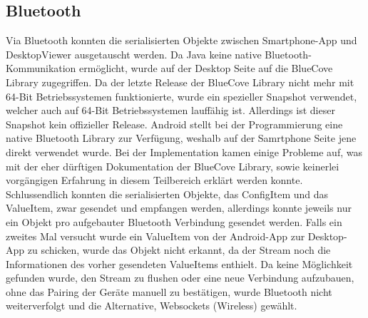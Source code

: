 \subsection{Bluetooth}
Via Bluetooth konnten die serialisierten Objekte zwischen Smartphone-App 
und DesktopViewer ausgetauscht werden. 
Da Java keine native Bluetooth-Kommunikation ermöglicht, wurde auf der 
Desktop Seite auf die BlueCove Library zugegriffen. Da der letzte Release der 
BlueCove Library nicht mehr mit 64-Bit Betriebssystemen funktionierte, wurde ein spezieller Snapshot 
verwendet, welcher auch auf 64-Bit Betriebssystemen lauffähig ist. Allerdings ist dieser Snapshot 
kein offizieller Release.
Android stellt bei der Programmierung eine native Bluetooth 
Library zur Verfügung, weshalb auf der Samrtphone Seite jene direkt verwendet wurde. 
Bei der Implementation kamen einige Probleme auf, was mit der eher dürftigen 
Dokumentation der BlueCove Library, sowie keinerlei vorgängigen Erfahrung in diesem Teilbereich 
erklärt werden konnte. Schlussendlich konnten die serialisierten Objekte, das ConfigItem 
und das ValueItem, zwar gesendet und empfangen werden, allerdings konnte jeweils nur ein Objekt pro aufgebauter 
Bluetooth Verbindung gesendet werden. Falls ein zweites Mal versucht wurde ein ValueItem von der 
Android-App zur Desktop-App zu schicken, wurde das Objekt nicht erkannt, da der 
Stream noch die Informationen des vorher gesendeten ValueItems enthielt. 
Da keine Möglichkeit gefunden wurde, den Stream zu flushen oder eine neue 
Verbindung aufzubauen, ohne das Pairing der Geräte manuell zu bestätigen, wurde Bluetooth 
nicht weiterverfolgt und die Alternative, Websockets (Wireless) gewählt. 

            
